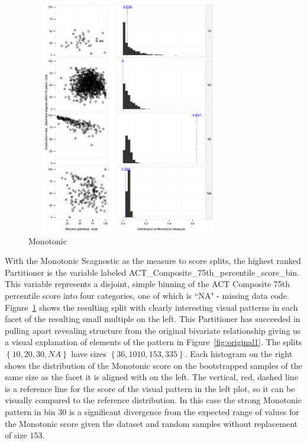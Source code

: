 \begin{figure}
\includegraphics[width=3.5in,height=4in]{images/24_6604273087972-ACT_Composite_75th_percentile_score_bin.pdf}
  \caption{Monotonic}
 \label{fig:monotonic1}
\end{figure}

With the Monotonic Scagnostic as the measure to score splits, the highest ranked Partitioner is the variable labeled ACT\_Composite\_75th\_percentile\_score\_bin. This variable represents a disjoint, simple binning of the ACT Composite 75th percentile score into four categories, one of which is ``NA" - missing data code. Figure~\ref{fig:monotonic1} shows the resulting split with clearly interesting visual patterns in each facet of the resulting small multiple on the left. This Partitioner has succeeded in pulling apart revealing structure from the original bivariate relationship giving us a visual explanation of elements of the pattern in Figure~\ref{fig:original1}. 
The splits $\left\{{10, 20, 30, NA}\right\}$ have sizes $\left\{{36, 1010, 153, 335}\right\}$. Each histogram on the right shows the distribution of the Monotonic score on the bootstrapped samples of the same size as the facet it is aligned with on the left. The vertical, red, dashed line is a reference line for the score of the visual pattern in the left plot, so it can be visually compared to the reference distribution. In this case the strong Monotonic pattern in bin $30$ is a significant divergence from the expected range of values for the Monotonic score given the dataset and random samples without replacement of size $153$.

